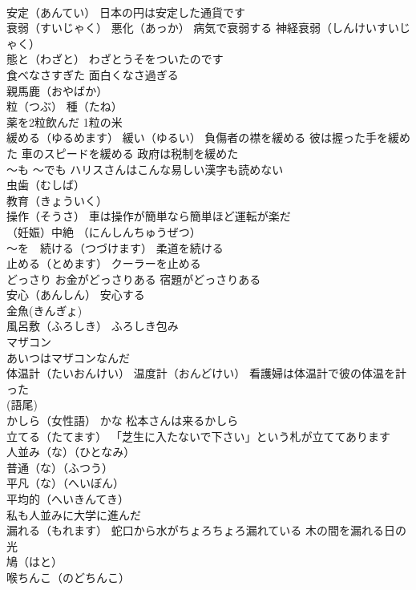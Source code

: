 \documentclass[8pt]{extreport}
\begin{document}
\begin{CJK}{UTF8}{min}
\\	安定（あんてい） 日本の円は安定した通貨です
\\	衰弱（すいじゃく） 悪化（あっか） 病気で衰弱する 神経衰弱（しんけいすいじゃく）
\\	態と（わざと） わざとうそをついたのです
\\	食べなさすぎた 面白くなさ過ぎる
\\	親馬鹿（おやばか）
\\	粒（つぶ） 種（たね）
\\	薬を2粒飲んだ 1粒の米
\\	緩める（ゆるめます） 緩い（ゆるい） 負傷者の襟を緩める 彼は握った手を緩めた 車のスピードを緩める 政府は税制を緩めた
\\	～も ～でも ハリスさんはこんな易しい漢字も読めない
\\	虫歯（むしば）
\\	教育（きょういく）
\\	操作（そうさ） 車は操作が簡単なら簡単ほど運転が楽だ
\\	（妊娠）中絶 （にんしんちゅうぜつ）
\\	～を　続ける（つづけます） 柔道を続ける
\\	止める（とめます） クーラーを止める
\\	どっさり お金がどっさりある 宿題がどっさりある
\\	安心（あんしん） 安心する
\\	金魚(きんぎょ)
\\	風呂敷（ふろしき） ふろしき包み
\\	マザコン 
\\	あいつはマザコンなんだ
\\	体温計（たいおんけい） 温度計（おんどけい） 看護婦は体温計で彼の体温を計った
\\	(語尾) 
\\	かしら（女性語） かな 松本さんは来るかしら
\\	立てる（たてます） 「芝生に入たないで下さい」という札が立ててあります
\\	人並み（な）（ひとなみ） 
\\	普通（な）（ふつう） 
\\	平凡（な）（へいぼん） 
\\	平均的（へいきんてき） 
\\	私も人並みに大学に進んだ
\\	漏れる（もれます） 蛇口から水がちょろちょろ漏れている 木の間を漏れる日の光
\\	鳩（はと）
\\	喉ちんこ（のどちんこ）

\end{CJK}
\end{document}
